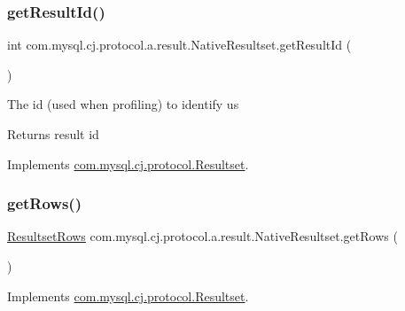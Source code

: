 \subsubsection{\texorpdfstring{get\+Result\+Id()}{getResultId()}}
{\footnotesize\ttfamily int com.\+mysql.\+cj.\+protocol.\+a.\+result.\+Native\+Resultset.\+get\+Result\+Id (\begin{DoxyParamCaption}{ }\end{DoxyParamCaption})}

The id (used when profiling) to identify us

\begin{DoxyReturn}{Returns}
result id 
\end{DoxyReturn}


Implements \mbox{\hyperlink{interfacecom_1_1mysql_1_1cj_1_1protocol_1_1_resultset_a77886132904378ea915db2b4803e588c}{com.\+mysql.\+cj.\+protocol.\+Resultset}}.

\mbox{\label{classcom_1_1mysql_1_1cj_1_1protocol_1_1a_1_1result_1_1_native_resultset_a7f78b25cd2c764cf15975f10767d0de8}} 
\subsubsection{\texorpdfstring{get\+Rows()}{getRows()}}
{\footnotesize\ttfamily \mbox{\hyperlink{interfacecom_1_1mysql_1_1cj_1_1protocol_1_1_resultset_rows}{Resultset\+Rows}} com.\+mysql.\+cj.\+protocol.\+a.\+result.\+Native\+Resultset.\+get\+Rows (\begin{DoxyParamCaption}{ }\end{DoxyParamCaption})}



Implements \mbox{\hyperlink{interfacecom_1_1mysql_1_1cj_1_1protocol_1_1_resultset_a56ff0f26904a612a034bf839cae46d51}{com.\+mysql.\+cj.\+protocol.\+Resultset}}.

\mbox{\label{classcom_1_1mysql_1_1cj_1_1protocol_1_1a_1_1result_1_1_native_resultset_a02eab42717038056dfd049351e3d13b1}} 
